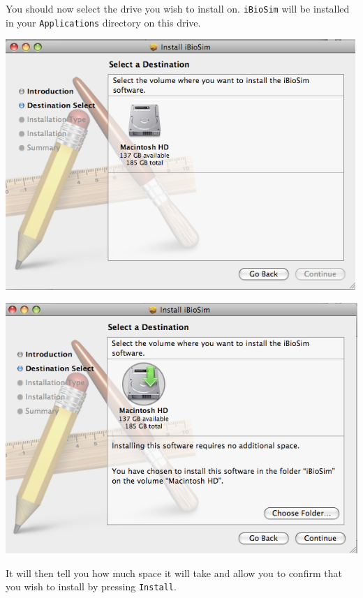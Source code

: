 \documentclass[titlepage,11pt]{article}
\begin{document}
\clearpage

You should now select the drive you wish to install on.  {\tt iBioSim}
will be installed in your {\tt Applications} directory on this drive.

\includegraphics[height=95mm]{screenshots/destination}

\includegraphics[height=95mm]{screenshots/select}

\clearpage

It will then tell you how much space it will take and allow you to
confirm that you wish to install by pressing {\tt Install}.
\end{document}
